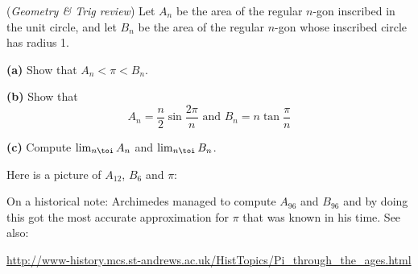 \problem \groupproblem (\textit{Geometry \& Trig review})
Let $A_n$ be the area of the
regular $n$-gon inscribed in the unit circle, and let $B_n$ be the area of
the regular $n$-gon whose inscribed circle has radius 1.

\textbf{(a)} Show that $A_n < \pi < B_n$.

\textbf{(b)} Show that
\[
A_n = \frac n2 \sin\frac{2\pi}{n} \text{ and } B_n = n \tan\frac\pi n
\]

\textbf{(c)} Compute $\lim_{n\toi}A_n$ and $\lim_{n\toi}B_n$.

\medskip\noindent Here is a picture of $A_{12}$, $B_6$ and $\pi$:

\noindent

On a historical note: Archimedes managed to compute $A_{96}$ and
$B_{96}$ and by doing this got the most accurate approximation for
$\pi$ that was known in his time.  See also:
\begin{center}
  \url{http://www-history.mcs.st-andrews.ac.uk/HistTopics/Pi_through_the_ages.html}
\end{center}

